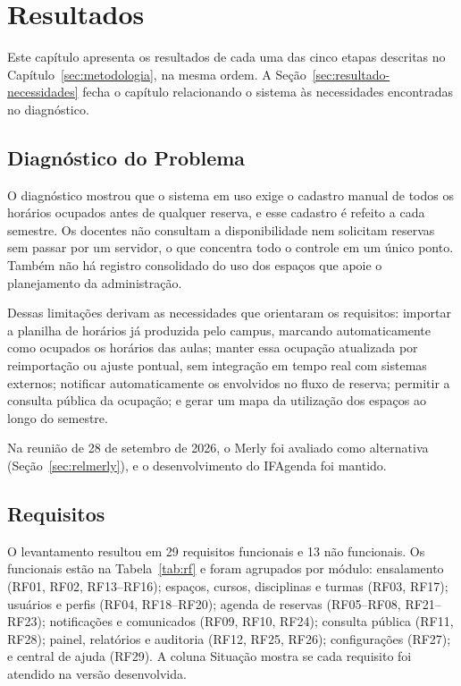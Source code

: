 \chapter{Resultados}
\label{cap4_resultados}

Este capítulo apresenta os resultados de cada uma das cinco etapas descritas no Capítulo~\ref{sec:metodologia}, na mesma ordem. A Seção~\ref{sec:resultado-necessidades} fecha o capítulo relacionando o sistema às necessidades encontradas no diagnóstico.

\section{Diagnóstico do Problema}
\label{sec:resultado-diagnostico}

O diagnóstico mostrou que o sistema em uso exige o cadastro manual de todos os horários ocupados antes de qualquer reserva, e esse cadastro é refeito a cada semestre. Os docentes não consultam a disponibilidade nem solicitam reservas sem passar por um servidor, o que concentra todo o controle em um único ponto. Também não há registro consolidado do uso dos espaços que apoie o planejamento da administração.

Dessas limitações derivam as necessidades que orientaram os requisitos: importar a planilha de horários já produzida pelo campus, marcando automaticamente como ocupados os horários das aulas; manter essa ocupação atualizada por reimportação ou ajuste pontual, sem integração em tempo real com sistemas externos; notificar automaticamente os envolvidos no fluxo de reserva; permitir a consulta pública da ocupação; e gerar um mapa da utilização dos espaços ao longo do semestre.

Na reunião de 28 de setembro de 2026, o Merly foi avaliado como alternativa (Seção~\ref{sec:relmerly}), e o desenvolvimento do IFAgenda foi mantido.

\section{Requisitos}
\label{sec:resultado-requisitos}

O levantamento resultou em 29 requisitos funcionais e 13 não funcionais. Os funcionais estão na Tabela~\ref{tab:rf} e foram agrupados por módulo: ensalamento (RF01, RF02, RF13--RF16); espaços, cursos, disciplinas e turmas (RF03, RF17); usuários e perfis (RF04, RF18--RF20); agenda de reservas (RF05--RF08, RF21--RF23); notificações e comunicados (RF09, RF10, RF24); consulta pública (RF11, RF28); painel, relatórios e auditoria (RF12, RF25, RF26); configurações (RF27); e central de ajuda (RF29). A coluna Situação mostra se cada requisito foi atendido na versão desenvolvida.


